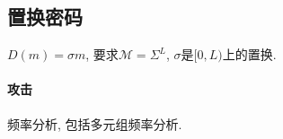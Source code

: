 \documentclass{ctexart}
\begin{document}
\subsection{置换密码}
    $D(m) = \sigma m$, 要求$\mathcal{M} = \Sigma^L$, $\sigma$是$[0, L)$上的置换.
\paragraph{攻击} 频率分析, 包括多元组频率分析.

\end{document}
